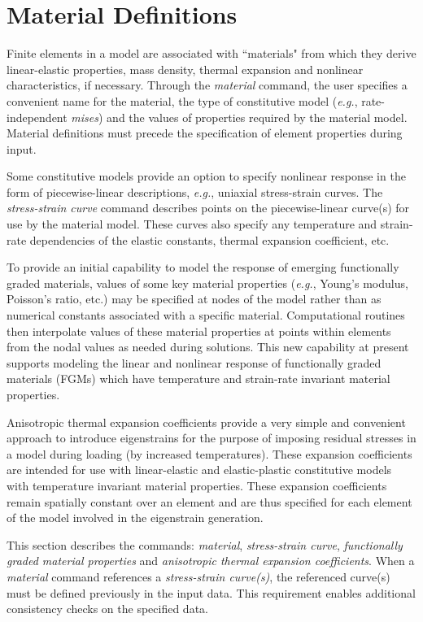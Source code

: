 \documentclass[11pt]{report}
\numberwithin{equation}{section}
\newcommand{\eg}{\emph{e.g.},\xspace}
\newcommand{\ti}{\emph}
\begin{document}
\section{Material Definitions}

\noindent
Finite elements in a model are associated with ``materials" from which they
derive linear-elastic properties, mass density, thermal expansion and nonlinear
characteristics, if necessary. Through the \ti{material} command, the user specifies
a convenient name for the material, the type of constitutive model (\eg
rate-independent \ti{mises}) and the values of properties required by the
material model. Material definitions must precede the specification of element
properties during input.

Some constitutive models provide an option to specify nonlinear response in the
form of piecewise-linear descriptions, \eg uniaxial stress-strain
curves. The \ti{stress-strain curve} command describes points on the piecewise-linear
curve(s) for use by the material model. These curves also specify any
temperature and strain-rate dependencies of the elastic constants, thermal
expansion coefficient, etc.

To provide an initial capability to model the response of emerging functionally
graded materials, values of some key material properties (\eg Young's modulus,
Poisson's ratio, etc.) may be specified at nodes of the model rather than as
numerical constants associated with a specific material. Computational routines
then interpolate values of these material properties at points within elements
from the nodal values as needed during solutions. This new capability at present
supports modeling the linear and nonlinear response of functionally graded materials
(FGMs) which have
temperature and strain-rate invariant material properties. 

Anisotropic thermal expansion coefficients provide a very simple and convenient
approach to introduce eigenstrains for the purpose of imposing residual stresses
in a model during loading (by increased temperatures). These expansion
coefficients are intended for use with linear-elastic and elastic-plastic
constitutive models with temperature invariant material properties. These
expansion coefficients remain spatially constant over an element and are thus
specified for each element of the model involved in the eigenstrain generation.

This section describes the commands: \ti{material}, \ti{stress-strain curve}, \ti{functionally graded
material properties} and \ti{anisotropic thermal expansion coefficients}.
When a \ti{material} command references a \ti{stress-strain curve(s)}, the referenced
curve(s) must be defined previously in the input data. This requirement enables
additional consistency checks on the specified data.
\end{document}
